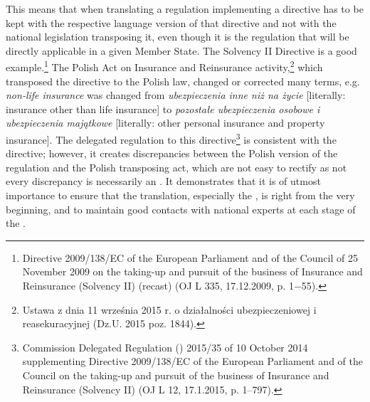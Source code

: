 \documentclass[output=paper]{langsci/langscibook}
\begin{document}
This means that when translating a regulation implementing a directive  has to be kept with the respective language version of that directive and not with the national legislation transposing it, even though it is the regulation that will be directly applicable in a given Member State. The Solvency II Directive is a good example.\footnote{Directive 2009/138/EC of the European Parliament and of the Council of 25 November 2009 on the taking-up and pursuit of the business of Insurance and Reinsurance (Solvency II) (recast) (OJ L 335, 17.12.2009, p. 1$-$55).} The Polish Act on Insurance and Reinsurance activity,\footnote{Ustawa z dnia 11 września 2015 r. o działalności ubezpieczeniowej i reasekuracyjnej (Dz.U. 2015 poz. 1844).} which transposed the directive to the Polish law, changed or corrected many terms, e.g. \textit{non-life insurance} was changed from \textit{ubezpieczenia inne niż na życie} [literally: insurance other than life insurance] to \textit{pozostałe ubezpieczenia osobowe i ubezpieczenia majątkowe} [literally: other personal insurance and property insurance]. The delegated regulation to this directive\footnote{Commission Delegated Regulation () 2015/35 of 10 October 2014 supplementing Directive 2009/138/EC of the European Parliament and of the Council on the taking-up and pursuit of the business of Insurance and Reinsurance (Solvency II) (OJ L 12, 17.1.2015, p. 1–797).} is consistent with the directive; however, it creates discrepancies between the Polish version of the regulation and the Polish transposing act, which are not easy to rectify as not every discrepancy is necessarily an . It demonstrates that it is of utmost importance to ensure that the translation, especially the , is right from the very beginning, and to maintain good contacts with national experts at each stage of the .
\end{document}
